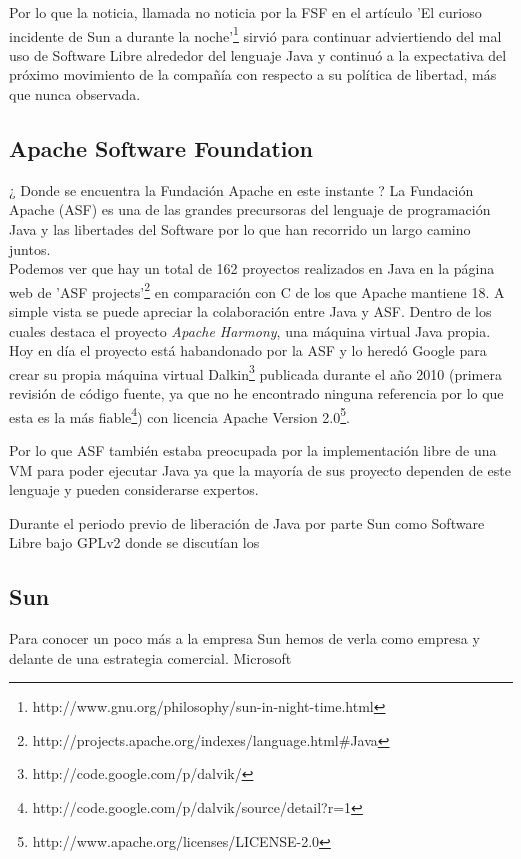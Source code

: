\documentclass[11pt]{scrartcl}
\begin{document}
Por lo que la noticia, llamada no noticia por la FSF en el artículo 'El curioso incidente de Sun a durante la noche'\footnote{http://www.gnu.org/philosophy/sun-in-night-time.html} sirvió para continuar adviertiendo del mal uso de Software Libre alrededor del lenguaje Java y continuó a la expectativa del próximo movimiento de la compañía con respecto a su política de libertad, más que nunca observada.

\subsection{Apache Software Foundation}

¿ Donde se encuentra la Fundación Apache en este instante ? La Fundación Apache (ASF) es una de las grandes precursoras del lenguaje de programación Java y las libertades del Software por lo que han recorrido un largo camino juntos.\\
Podemos ver que hay un total de 162 proyectos realizados en Java en la página web de 'ASF projects'\footnote{http://projects.apache.org/indexes/language.html\#Java} en comparación con C de los que Apache mantiene 18. A simple vista se puede apreciar la colaboración entre Java y ASF. Dentro de los cuales destaca el proyecto \emph{Apache Harmony}, una máquina virtual Java propia. Hoy en día el proyecto está habandonado por la ASF y lo heredó Google para crear su propia máquina virtual Dalkin\footnote{http://code.google.com/p/dalvik/} publicada durante el año 2010 (primera revisión de código fuente, ya que no he encontrado ninguna referencia por lo que esta es la más fiable\footnote{http://code.google.com/p/dalvik/source/detail?r=1}) con licencia Apache Version 2.0\footnote{http://www.apache.org/licenses/LICENSE-2.0}.

Por lo que ASF también estaba preocupada por la implementación libre de una VM para poder ejecutar Java ya que la mayoría de sus proyecto dependen de este lenguaje y pueden considerarse expertos.

Durante el periodo previo de liberación de Java por parte Sun como Software Libre bajo GPLv2 donde se discutían los 

\subsection{Sun}

Para conocer un poco más a la empresa Sun hemos de verla como empresa y delante de una estrategia comercial.
Microsoft
\end{document}
